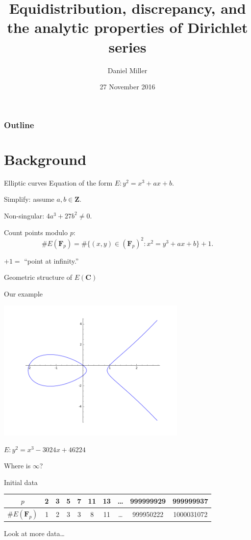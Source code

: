 \documentclass{beamer}
\title{Equidistribution, discrepancy, and the analytic properties of Dirichlet series}
\author{Daniel Miller}
\institute{Cornell University}
\date{27 November 2016}
\newcommand{\bC}{\mathbf{C}}
\newcommand{\bF}{\mathbf{F}}
\newcommand{\bZ}{\mathbf{Z}}
\begin{document}
\begin{frame}
\titlepage
\end{frame}

\begin{frame}
\frametitle{Outline}
\tableofcontents
\end{frame}

\section{Background}

\begin{frame}{Elliptic curves}
Equation of the form $E:y^2=x^3+ax+b$.
\pause

Simplify: assume $a,b\in \bZ$.
\pause

Non-singular: $4a^3+27b^2\ne 0$. 
\pause

Count points modulo $p$: 
\[
	\# E(\bF_p) = \#\{(x,y)\in (\bF_p)^2 : x^2=y^3+ax+b\} + 1 .
\]
\pause

$+1=$ ``point at infinity.''
\pause

Geometric structure of $E(\bC)$
\end{frame}

\begin{frame}{Our example}
\begin{center}
\includegraphics[width=0.7\textwidth]{rank2_contour}

$E:y^2 = x^3 - 3024 x + 46224$
\end{center}
\pause

Where is $\infty$?
\end{frame}

\begin{frame}{Initial data}
\begin{tabular}{c|ccccccccc}
$p$ & 2 & 3 & 5 & 7 & 11 & 13 & \ldots & 999999929 & 999999937 \\ \hline
$\# E(\bF_p)$ & 1 & 2 & 3 & 3 & 8 & 11 & \ldots & 999950222 & 1000031072
\end{tabular}

\pause
Look at more data\ldots
\end{frame}
\end{document}

